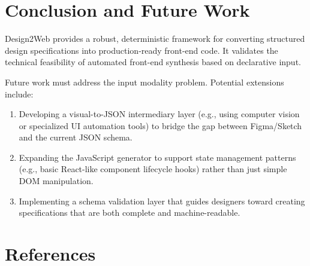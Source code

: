 \documentclass[11pt,a4paper]{article}
\begin{document}
\section{Conclusion and Future Work}
Design2Web provides a robust, deterministic framework for converting structured design specifications into production-ready front-end code. It validates the technical feasibility of automated front-end synthesis based on declarative input.

Future work must address the input modality problem. Potential extensions include:
\begin{enumerate}
    \item Developing a visual-to-JSON intermediary layer (e.g., using computer vision or specialized UI automation tools) to bridge the gap between Figma/Sketch and the current JSON schema.
    \item Expanding the JavaScript generator to support state management patterns (e.g., basic React-like component lifecycle hooks) rather than just simple DOM manipulation.
    \item Implementing a schema validation layer that guides designers toward creating specifications that are both complete and machine-readable.
\end{enumerate}

\section*{References}


\end{document}
